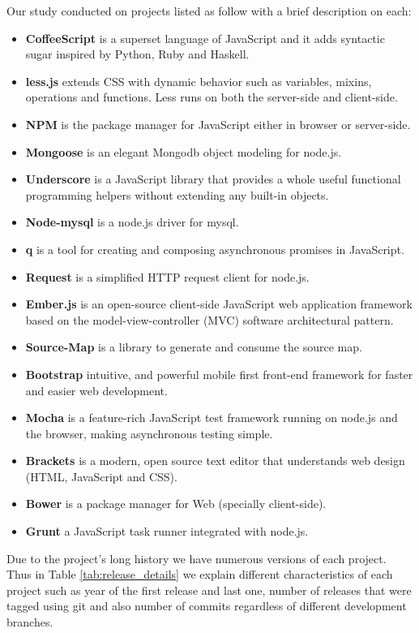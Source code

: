 Our study conducted on projects listed as follow with a brief description on each:
\begin{itemize}
	\item \textbf{CoffeeScript} is a superset language of JavaScript and it adds syntactic sugar inspired by Python, Ruby and Haskell.
	\item \textbf{less.js} extends CSS with dynamic behavior such as variables, mixins, operations and functions. Less runs on both the server-side and client-side.
	\item \textbf{NPM} is the package manager for JavaScript either in browser or server-side.
	\item \textbf {Mongoose} is an elegant Mongodb object modeling for node.js.
	\item \textbf{Underscore} is a JavaScript library that provides a whole useful functional programming helpers without extending any built-in objects.
	\item \textbf {Node-mysql} is a node.js driver for mysql.
	\item \textbf {q} is a tool for creating and composing asynchronous promises in JavaScript.
	\item \textbf {Request} is a simplified HTTP request client for node.js.
	\item \textbf{Ember.js} is an open-source client-side JavaScript web application framework based on the model-view-controller (MVC) software architectural pattern.
	\item \textbf{Source-Map} is a library to generate and consume the source map.
	\item \textbf{Bootstrap} intuitive, and powerful mobile first front-end framework for faster and easier web development.
	\item \textbf{Mocha} is a feature-rich JavaScript test framework running on node.js and the browser, making asynchronous testing simple.
	\item \textbf{Brackets} is a modern, open source text editor that understands web design (HTML, JavaScript and CSS).
	\item \textbf{Bower} is a package manager for Web (specially client-side).
	\item \textbf{Grunt} a JavaScript task runner integrated with node.js.	
\end{itemize} 
Due to the project's long history we have numerous versions of each project. Thus in Table \ref{tab:release_details} we explain different characteristics of each project such as year of the first release and last one, number of releases that were tagged using git and also number of commits regardless of different development branches.
